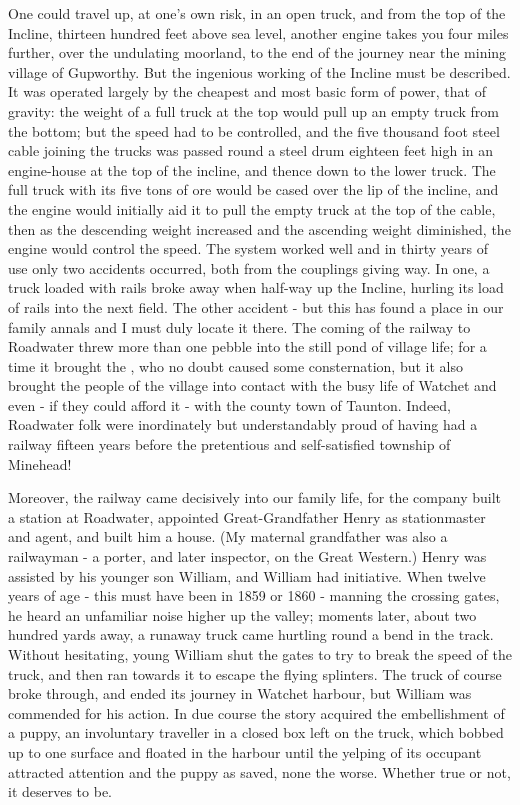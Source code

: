 One could travel up, at one's own risk, in an open truck, and from the top of the Incline, thirteen hundred feet above sea level, another engine takes you four miles further, over the undulating moorland, to the end of the journey near the mining village of Gupworthy. But the ingenious working of the Incline must be described. It was operated largely by the cheapest and most basic form of power, that of gravity: the weight of a full truck at the top would pull up an empty truck from the bottom; but the speed had to be controlled, and the five thousand foot steel cable joining the trucks was passed round a steel drum eighteen feet high in an engine-house at the top of the incline, and thence down to the lower truck. The full truck with its five tons of ore would be cased over the lip of the incline, and the engine would initially aid it to pull the empty truck at the top of the cable, then as the descending weight increased and the ascending weight diminished, the engine would control the speed. The system worked well and in thirty years of use only two accidents occurred, both from the couplings giving way. In one, a truck loaded with rails broke away when half-way up the Incline, hurling its load of rails into the next field. The other accident - but this has found a place in our family annals and I must duly locate it there.
The coming of the railway to Roadwater threw more than one pebble into the still pond of village life; for a time it brought the , who no doubt caused some consternation, but it also brought the people of the village into contact with the busy life of Watchet and even - if they could afford it - with the county town of Taunton. Indeed, Roadwater folk were inordinately but understandably proud of having had a railway fifteen years before the pretentious and self-satisfied township of Minehead!

Moreover, the railway came decisively into our family life, for the company built a station at Roadwater, appointed Great-Grandfather Henry as stationmaster and agent, and built him a house. (My maternal grandfather was also a railwayman - a porter, and later inspector, on the Great Western.) Henry was assisted by his younger son William, and William had initiative. When twelve years of age - this must have been in 1859 or 1860 - manning the crossing gates, he heard an unfamiliar noise higher up the valley; moments later, about two hundred yards away, a runaway truck came hurtling round a bend in the track. Without hesitating, young William shut the gates to try to break the speed of the truck, and then ran towards it to escape the flying splinters. The truck of course broke through, and ended its journey in Watchet harbour, but William was commended for his action.
In due course the story acquired the embellishment of a puppy, an involuntary traveller in a closed box left on the truck, which bobbed up to one surface and floated in the harbour until the yelping of its occupant attracted attention and the puppy as saved, none the worse. Whether true or not, it deserves to be.

